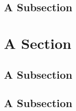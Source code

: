 \documentclass[a4paper,dottedtoc,headinclude,footinclude]{report} %
\theoremstyle{plain}
\begin{document}
    \subsection{A Subsection}
    \lipsum[1]

    \section{A Section}
    \lipsum[1]
    
    \subsection{A Subsection}
    \lipsum[1]
    \subsection{A Subsection}
    \lipsum[1]

    \iffalse
    \nocite{*}
    \addtocontents{toc}{\protect\vspace{\beforebibskip}}
    \addcontentsline{toc}{section}{\refname}    
    
    
    \fi
\end{document}
